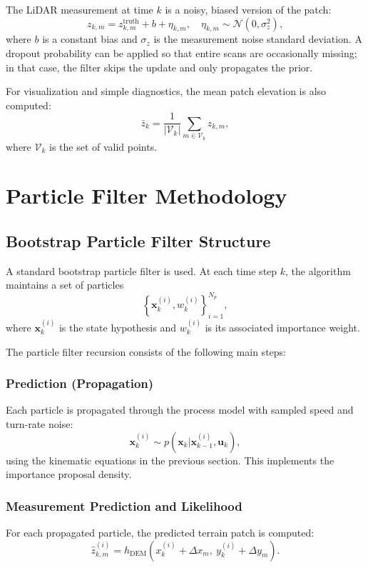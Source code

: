 \documentclass[conference]{IEEEtran}
\begin{document}
The LiDAR measurement at time $k$ is a noisy, biased version of the patch:
\begin{equation}
  z_{k,m} = z_{k,m}^{\text{truth}} + b + \eta_{k,m}, \quad
  \eta_{k,m} \sim \mathcal{N}(0,\sigma_z^2),
\end{equation}
where $b$ is a constant bias and $\sigma_z$ is the measurement noise standard deviation. A dropout probability can be applied so that entire scans are occasionally missing; in that case, the filter skips the update and only propagates the prior.

For visualization and simple diagnostics, the mean patch elevation is also computed:
\begin{equation}
  \bar{z}_k = \frac{1}{|\mathcal{V}_k|} \sum_{m \in \mathcal{V}_k} z_{k,m},
\end{equation}
where $\mathcal{V}_k$ is the set of valid points.

\section{Particle Filter Methodology}
\subsection{Bootstrap Particle Filter Structure}
A standard bootstrap particle filter is used. At each time step $k$, the algorithm maintains a set of particles
\begin{equation}
  \left\{ \bm{x}_k^{(i)}, w_k^{(i)} \right\}_{i=1}^{N_p},
\end{equation}
where $\bm{x}_k^{(i)}$ is the state hypothesis and $w_k^{(i)}$ is its associated importance weight.

The particle filter recursion consists of the following main steps:

\subsubsection{Prediction (Propagation)}
Each particle is propagated through the process model with sampled speed and turn-rate noise:
\begin{equation}
  \bm{x}_k^{(i)} \sim p(\bm{x}_k | \bm{x}_{k-1}^{(i)}, \bm{u}_k),
\end{equation}
using the kinematic equations in the previous section. This implements the importance proposal density.

\subsubsection{Measurement Prediction and Likelihood}
For each propagated particle, the predicted terrain patch is computed:
\begin{equation}
  \hat{z}_{k,m}^{(i)} = h_{\text{DEM}}(x_k^{(i)} + \Delta x_m,\ y_k^{(i)} + \Delta y_m).
\end{equation}
\end{document}
